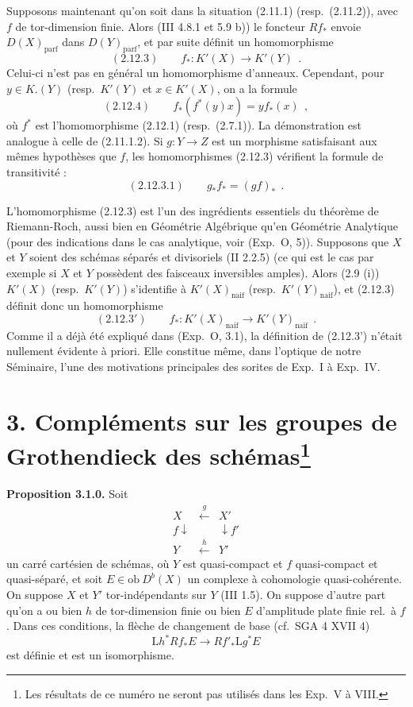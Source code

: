 Supposons maintenant qu'on soit dans la situation (2.11.1) (resp.\ (2.11.2)), avec $f$ de tor-dimension finie. Alors (III 4.8.1 et 5.9 b)) le foncteur $Rf_*$ envoie $D(X)_{\mathrm{parf}}$ dans $D(Y)_{\mathrm{parf}}$, et par suite d\'{e}finit un homomorphisme
\[
\mathrm{(2.12.3)} \qquad f_* : K'(X) \longrightarrow K'(Y)\ \ .
\]
Celui-ci n'est pas en g\'{e}n\'{e}ral un homomorphisme d'anneaux. Cependant, pour $y \in K.(Y)$ (resp.\ $K'(Y)$ et $x \in K'(X)$, on a la formule
\[
\mathrm{(2.12.4)} \qquad f_*(f^*(y)x) = yf_*(x)\ \ ,
\]
o\`{u} $f^*$ est l'homomorphisme (2.12.1) (resp.\ (2.7.1)). La d\'{e}monstration est analogue \`{a} celle de (2.11.1.2). Si $g : Y \longrightarrow Z$ est un morphisme satisfaisant aux m\^{e}mes hypoth\`{e}ses que $f$, les homomorphismes (2.12.3) v\'{e}rifient la formule de transitivit\'{e} :
\[
\mathrm{(2.12.3.1)} \qquad g_*f_* = (gf)_*\ \ .
\]

L'homomorphisme (2.12.3) est l'un des ingr\'{e}dients essentiels du th\'{e}or\`{e}me de Riemann-Roch, aussi bien en G\'{e}om\'{e}trie Alg\'{e}brique qu'en G\'{e}om\'{e}trie Analytique (pour des indications dans le cas analytique, voir (Exp.\ O, 5)). Supposons que $X$ et $Y$ soient des sch\'{e}mas s\'{e}par\'{e}s et divisoriels (II 2.2.5) (ce qui est le cas par exemple si $X$ et $Y$ poss\`{e}dent des faisceaux inversibles amples). Alors (2.9 (i)) $K'(X)$ (resp.\ $K'(Y)$) s'identifie \`{a} $K'(X)_{\mathrm{naif}}$ (resp.\ $K'(Y)_{\mathrm{naif}}$), et (2.12.3) d\'{e}finit donc un homomorphisme
\[
\mathrm{(2.12.3')} \qquad f_* : K'(X)_{\mathrm{naif}} \longrightarrow K'(Y)_{\mathrm{naif}}\ \ .
\]
Comme il a d\'{e}j\`{a} \'{e}t\'{e} expliqu\'{e} dans (Exp.\ O, 3.1), la d\'{e}finition de (2.12.3') n'\'{e}tait nullement \'{e}vidente \`{a} priori. Elle constitue m\^{e}me, dans l'optique de notre S\'{e}minaire, l'une des motivations principales des sorites de Exp.\ I \`{a} Exp.\ IV.

\newpage

\section*{3. Compl\'{e}ments sur les groupes de Grothendieck des sch\'{e}mas\footnote{Les r\'{e}sultats de ce num\'{e}ro ne seront pas utilis\'{e}s dans les Exp.\ V \`{a} VIII.}}

\medskip

\noindent\textbf{Proposition 3.1.0.} Soit
\[
\begin{array}{ccc}
X & \xleftarrow{\ g\ } & X' \\
f \downarrow & & \downarrow f' \\
Y & \xleftarrow{\ h\ } & Y'
\end{array}
\]
un carr\'{e} cart\'{e}sien de sch\'{e}mas, o\`{u} $Y$ est quasi-compact et $f$ quasi-compact et quasi-s\'{e}par\'{e}, et soit $E \in \mathrm{ob}\ D^b(X)$ un complexe \`{a} cohomologie quasi-coh\'{e}rente. On suppose $X$ et $Y'$ tor-ind\'{e}pendants sur $Y$ (III 1.5). On suppose d'autre part qu'on a ou bien $h$ de tor-dimension finie ou bien $E$ d'amplitude plate finie rel.\ \`{a} $f$. Dans ces conditions, la fl\`{e}che de changement de base (cf.\ SGA 4 XVII 4)
\[
\mathrm{L}h^* Rf_* E \longrightarrow Rf'_* \mathrm{L}g^* E
\]
est d\'{e}finie et est un isomorphisme.

